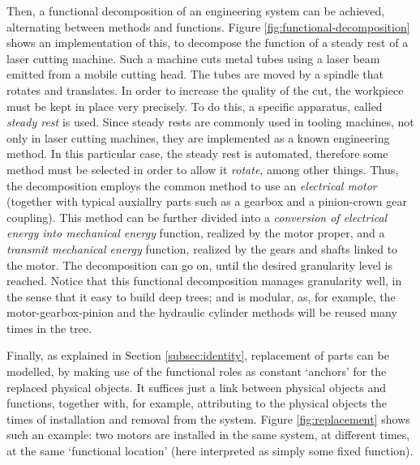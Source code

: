 \documentclass[
]{ceurart}
\begin{document}
Then, a functional decomposition of an engineering system can be achieved, alternating between methods and functions. Figure \ref{fig:functional-decomposition} shows an implementation of this, to decompose the function of a steady rest of a laser cutting machine.
Such a machine cuts metal tubes using a laser beam emitted from a mobile cutting head. The tubes are moved by a spindle that rotates and translates. In order to increase the quality of the cut, the workpiece must be kept in place very precisely. To do this, a specific apparatus, called \textit{steady rest} is used. Since steady rests are commonly used in tooling machines, not only in laser cutting machines, they are implemented as a known engineering method. In this particular case, the steady rest is automated, therefore some method must be selected in order to allow it \textit{rotate}, among other things. Thus, the decomposition employs the common method to use an \textit{electrical motor} (together with typical auxiallry parts such as a gearbox and a pinion-crown gear coupling). This method can be further divided into a \textit{conversion of electrical energy into mechanical energy} function, realized by the motor proper, and a \textit{transmit mechanical energy} function, realized by the gears and shafts linked to the motor. The decomposition can go on, until the desired granularity level is reached. 
Notice that this functional decomposition manages granularity well, in the sense that it easy to build deep trees; and is modular, as, for example, the motor-gearbox-pinion and the hydraulic cylinder methods will be reused many times in the tree.

Finally, as explained in Section \ref{subsec:identity}, replacement of parts can be modelled, by making use of the functional roles as constant `anchors' for the replaced physical objects. It suffices just a link between physical objects and functions, together with, for example, attributing to the physical objects the times of installation and removal from the system. Figure \ref{fig:replacement} shows such an example: two motors are installed in the same system, at different times, at the same `functional location' (here interpreted as simply some fixed function).
\end{document}
